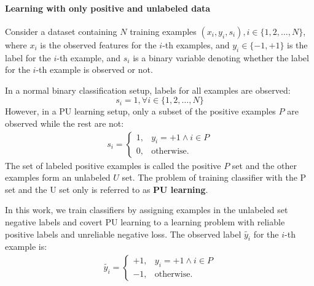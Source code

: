 
\paragraph{Learning with only positive and unlabeled data}
Consider a dataset containing $N$ training examples $(x_i,y_i,s_i), i \in \{1, 2, \dots, N\}$, where $x_i$ is the observed features for the $i$-th examples, and $y_i \in \{-1,+1\}$ is the label for the $i$-th example, and $s_i$ is a binary variable denoting whether the label for the $i$-th example is observed or not.



In a normal binary classification setup, labels for all examples are observed:
\begin{equation}
  s_i=1, \forall i\in\{1,2,\dots,N\}
\end{equation}
However, in a PU learning setup, only a subset of the positive examples $P$ are observed while the rest are not:
\begin{eqnarray}
s_i =
  \begin{cases}
    1, & y_i = +1 \land i\in P\\
    0, & \text{otherwise}.
  \end{cases}
\end{eqnarray}
The set of labeled positive examples is called the positive $P$ set and the other examples form an unlabeled $U$ set.
The problem of training classifier with the P set and the U set only is referred to as \textbf{PU learning}.

In this work, we train classifiers by assigning examples in the unlabeled set negative labels and covert PU learning to a learning problem with reliable positive labels and unreliable negative loss.
The observed label $\tilde{y_i}$ for the $i$-th example is:
\begin{eqnarray}
\tilde{y_i} =
  \begin{cases}
    +1, & y_i = +1 \land i\in P\\
    -1, & \text{otherwise}.
  \end{cases}
\end{eqnarray}

